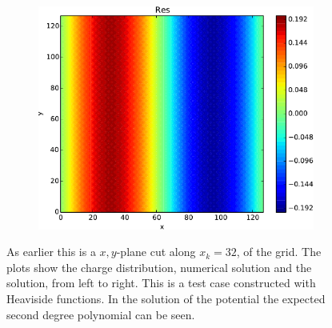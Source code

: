\begin{figure}
\begin{subfigure}[b]{0.32\textwidth}
				\end{subfigure}
				\begin{subfigure}[b]{0.32\textwidth}
					\includegraphics[width = \textwidth]{figures/verification/heaviside/residual.pdf}
				\end{subfigure}
			\caption{As earlier this is a \(x,y\)-plane cut along \(x_k=32\), of the grid. The plots show the charge distribution,
			numerical solution and the solution, from left to right. This is a test case constructed
			with Heaviside functions. In the solution of the potential the expected second degree polynomial can be seen.
			}
			\label{fig:heaviside}
		\end{figure}

